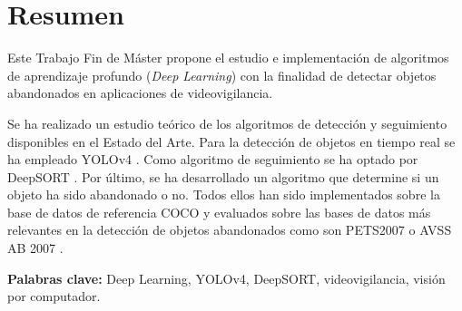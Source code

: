 
\chapter*{Resumen}
\label{cha:resumen}


Este Trabajo Fin de Máster propone el estudio e implementación de algoritmos de aprendizaje profundo (\textit{Deep Learning}) con la finalidad de detectar objetos abandonados en aplicaciones de videovigilancia.

Se ha realizado un estudio teórico de los algoritmos de detección y seguimiento disponibles en el Estado del Arte. Para la detección de objetos en tiempo real se ha empleado YOLOv4 \cite{bochkovskiy2020yolov4}. Como algoritmo de seguimiento se ha optado por DeepSORT \cite{Wojke2017simple}. Por último, se ha desarrollado un algoritmo que determine si un objeto ha sido abandonado o no. Todos ellos han sido implementados sobre la base de datos de referencia COCO \cite{lin2015microsoft} y evaluados sobre las bases de datos más relevantes en la detección de objetos abandonados como son PETS2007 \cite{pets2007-dataset} o AVSS AB 2007 \cite{AVSSAB2007-dataset}.

\textbf{Palabras clave:} Deep Learning, YOLOv4, DeepSORT, videovigilancia, visión por computador.